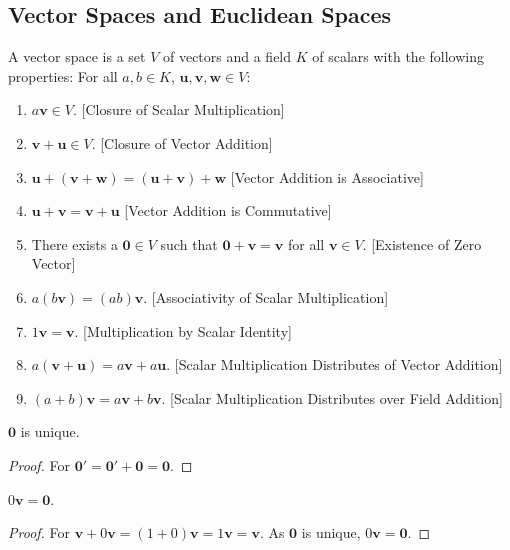         \subsection{Vector Spaces and Euclidean Spaces}
            \begin{definition}
            A vector space is a set $V$ of vectors and a field $K$ of scalars with the following properties: For all $a,b\in K$, $\mathbf{u,v,w}\in V$:
            \begin{enumerate}
                \item $a\mathbf{v} \in V$. \hfill [Closure of Scalar Multiplication]
                \item $\mathbf{v}+\mathbf{u} \in V$. \hfill [Closure of Vector Addition]
                \item $\mathbf{u}+(\mathbf{v}+\mathbf{w}) = (\mathbf{u}+\mathbf{v})+\mathbf{w}$ \hfill [Vector Addition is Associative]
                \item $\mathbf{u}+\mathbf{v}=\mathbf{v}+\mathbf{u}$ \hfill [Vector Addition is Commutative]
                \item There exists a $\mathbf{0}\in V$ such that $\mathbf{0}+\mathbf{v}=\mathbf{v}$ for all $\mathbf{v}\in V$. \hfill [Existence of Zero Vector]
                \item $a(b\mathbf{v}) = (ab)\mathbf{v}$. \hfill [Associativity of Scalar Multiplication]
                \item $1 \mathbf{v} = \mathbf{v}$. \hfill[Multiplication by Scalar Identity]
                \item $a(\mathbf{v}+\mathbf{u}) = a\mathbf{v}+a\mathbf{u}$. \hfill [Scalar Multiplication Distributes of Vector Addition]
                \item $(a+b)\mathbf{v}= a\mathbf{v}+b\mathbf{v}$. \hfill [Scalar Multiplication Distributes over Field Addition]
            \end{enumerate}
            \end{definition}
            \begin{theorem}
            $\mathbf{0}$ is unique.
            \end{theorem}
            \begin{proof}
            For $\mathbf{0}'=\mathbf{0}'+\mathbf{0}=\mathbf{0}$.
            \end{proof}
            \begin{theorem}
            $0\mathbf{v} = \mathbf{0}$.
            \end{theorem}
            \begin{proof}
            For $\mathbf{v}+0\mathbf{v} = (1+0)\mathbf{v} = 1\mathbf{v} = \mathbf{v}$. As $\mathbf{0}$ is unique, $0\mathbf{v}=\mathbf{0}$.
            \end{proof}
